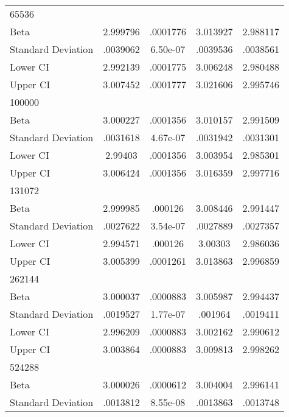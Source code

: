 {\begin{tabular}{l*{1}{cccc}}
\hline
65536               &            &            &            &            \\
Beta                &    2.999796&    .0001776&    3.013927&    2.988117\\
Standard Deviation  &    .0039062&    6.50e-07&    .0039536&    .0038561\\
Lower CI            &    2.992139&    .0001775&    3.006248&    2.980488\\
Upper CI            &    3.007452&    .0001777&    3.021606&    2.995746\\
\hline
100000              &            &            &            &            \\
Beta                &    3.000227&    .0001356&    3.010157&    2.991509\\
Standard Deviation  &    .0031618&    4.67e-07&    .0031942&    .0031301\\
Lower CI            &     2.99403&    .0001356&    3.003954&    2.985301\\
Upper CI            &    3.006424&    .0001356&    3.016359&    2.997716\\
\hline
131072              &            &            &            &            \\
Beta                &    2.999985&     .000126&    3.008446&    2.991447\\
Standard Deviation  &    .0027622&    3.54e-07&    .0027889&    .0027357\\
Lower CI            &    2.994571&     .000126&     3.00303&    2.986036\\
Upper CI            &    3.005399&    .0001261&    3.013863&    2.996859\\
\hline
262144              &            &            &            &            \\
Beta                &    3.000037&    .0000883&    3.005987&    2.994437\\
Standard Deviation  &    .0019527&    1.77e-07&     .001964&    .0019411\\
Lower CI            &    2.996209&    .0000883&    3.002162&    2.990612\\
Upper CI            &    3.003864&    .0000883&    3.009813&    2.998262\\
\hline
524288              &            &            &            &            \\
Beta                &    3.000026&    .0000612&    3.004004&    2.996141\\
Standard Deviation  &    .0013812&    8.55e-08&    .0013863&    .0013748\\

\end{tabular}}
